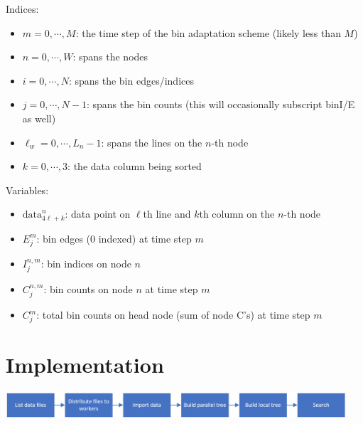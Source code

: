\documentclass{article}
\begin{document}
\begin{mdframed}[backgroundcolor=blue!20]
	Indices:
	\setlength\itemsep{0.1pt}
	\setlength\parskip{0.1pt}
	\begin{itemize}
		\setlength\itemsep{0.1pt}
		\setlength\parskip{0.1pt}
		\item $m = 0, \cdots, M$: the time step of the bin adaptation scheme (likely less than $M$)
		\item $n = 0, \cdots, W$: spans the nodes
		\item $i = 0, \cdots, N$: spans the bin edges/indices
		\item $j = 0, \cdots, N-1$: spans the bin counts (this will occasionally subscript binI/E as well)
		\item $\ell_w = 0, \cdots, L_n-1$: spans the lines on the $n$-th node
		\item $k = 0, \cdots, 3$: the data column being sorted
	\end{itemize}
\end{mdframed}

\begin{mdframed}[backgroundcolor=blue!20]
	Variables:
	\setlength\itemsep{0.1pt}
	\setlength\parskip{0.1pt}
	\begin{itemize}
		\setlength\itemsep{0.1pt}
		\setlength\parskip{0.1pt}
		\item $\textrm{data}^n_{4\ell+k}$: data point on $\ell$th line and $k$th column on the $n$-th node
		\item ${E}^m_j$: bin edges (0 indexed) at time step $m$
		\item ${I}^{n,m}_j$: bin indices on node $n$
		\item ${C}^{n,m}_j$: bin counts on node $n$ at time step $m$
		\item ${C}^m_j$: total bin counts on head node (sum of node C's) at time step $m$
	\end{itemize}
\end{mdframed}


%
%

\section{Implementation}

\begin{center}
\includegraphics[width=0.95\textwidth]{images/flow.png}
\end{center}
\end{document}
